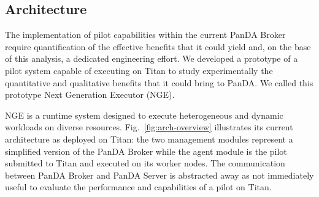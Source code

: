 


\subsection{Architecture}
\label{sec:arch}

The implementation of pilot capabilities within the current PanDA Broker require
quantification of the effective benefits that it could yield and, on the base of
this analysis, a dedicated engineering effort. We developed a prototype of a
pilot system capable of executing on Titan to study experimentally the
quantitative and qualitative benefits that it could bring to PanDA. We called
this prototype Next Generation Executor (NGE).


NGE is a runtime system designed to execute heterogeneous and dynamic workloads
on diverse resources. Fig.~\ref{fig:arch-overview} illustrates its current
architecture as deployed on Titan: the two management modules represent a
simplified version of the PanDA Broker while the agent module is the pilot
submitted to Titan and executed on its worker nodes. The communication between
PanDA Broker and PanDA Server is abstracted away as not immediately useful to
evaluate the performance and capabilities of a pilot on Titan.


